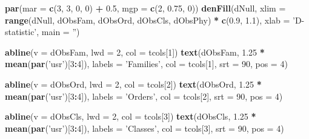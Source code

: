 \documentclass[]{article}
\newenvironment{Shaded}{\begin{snugshade}}{\end{snugshade}}
\newcommand{\KeywordTok}[1]{\textcolor[rgb]{0.13,0.29,0.53}{\textbf{#1}}}
\newcommand{\DataTypeTok}[1]{\textcolor[rgb]{0.13,0.29,0.53}{#1}}
\newcommand{\DecValTok}[1]{\textcolor[rgb]{0.00,0.00,0.81}{#1}}
\newcommand{\FloatTok}[1]{\textcolor[rgb]{0.00,0.00,0.81}{#1}}
\newcommand{\StringTok}[1]{\textcolor[rgb]{0.31,0.60,0.02}{#1}}
\newcommand{\OperatorTok}[1]{\textcolor[rgb]{0.81,0.36,0.00}{\textbf{#1}}}
\newcommand{\NormalTok}[1]{#1}
\begin{document}
\begin{Shaded}
\begin{Highlighting}[]
\KeywordTok{par}\NormalTok{(}\DataTypeTok{mar =} \KeywordTok{c}\NormalTok{(}\DecValTok{3}\NormalTok{, }\DecValTok{3}\NormalTok{, }\DecValTok{0}\NormalTok{, }\DecValTok{0}\NormalTok{) }\OperatorTok{+}\StringTok{ }\FloatTok{0.5}\NormalTok{, }\DataTypeTok{mgp =} \KeywordTok{c}\NormalTok{(}\DecValTok{2}\NormalTok{, }\FloatTok{0.75}\NormalTok{, }\DecValTok{0}\NormalTok{))}
\KeywordTok{denFill}\NormalTok{(dNull, }\DataTypeTok{xlim =} \KeywordTok{range}\NormalTok{(dNull, dObsFam, dObsOrd, dObsCls, dObsPhy) }\OperatorTok{*}\StringTok{ }\KeywordTok{c}\NormalTok{(}\FloatTok{0.9}\NormalTok{, }\FloatTok{1.1}\NormalTok{), }
        \DataTypeTok{xlab =} \StringTok{'D-statistic'}\NormalTok{, }\DataTypeTok{main =} \StringTok{''}\NormalTok{)}

\KeywordTok{abline}\NormalTok{(}\DataTypeTok{v =}\NormalTok{ dObsFam, }\DataTypeTok{lwd =} \DecValTok{2}\NormalTok{, }\DataTypeTok{col =}\NormalTok{ tcols[}\DecValTok{1}\NormalTok{])}
\KeywordTok{text}\NormalTok{(dObsFam, }\FloatTok{1.25} \OperatorTok{*}\StringTok{ }\KeywordTok{mean}\NormalTok{(}\KeywordTok{par}\NormalTok{(}\StringTok{'usr'}\NormalTok{)[}\DecValTok{3}\OperatorTok{:}\DecValTok{4}\NormalTok{]), }\DataTypeTok{labels =} \StringTok{'Families'}\NormalTok{, }\DataTypeTok{col =}\NormalTok{ tcols[}\DecValTok{1}\NormalTok{],}
     \DataTypeTok{srt =} \DecValTok{90}\NormalTok{, }\DataTypeTok{pos =} \DecValTok{4}\NormalTok{)}

\KeywordTok{abline}\NormalTok{(}\DataTypeTok{v =}\NormalTok{ dObsOrd, }\DataTypeTok{lwd =} \DecValTok{2}\NormalTok{, }\DataTypeTok{col =}\NormalTok{ tcols[}\DecValTok{2}\NormalTok{])}
\KeywordTok{text}\NormalTok{(dObsOrd, }\FloatTok{1.25} \OperatorTok{*}\StringTok{ }\KeywordTok{mean}\NormalTok{(}\KeywordTok{par}\NormalTok{(}\StringTok{'usr'}\NormalTok{)[}\DecValTok{3}\OperatorTok{:}\DecValTok{4}\NormalTok{]), }\DataTypeTok{labels =} \StringTok{'Orders'}\NormalTok{, }\DataTypeTok{col =}\NormalTok{ tcols[}\DecValTok{2}\NormalTok{],}
     \DataTypeTok{srt =} \DecValTok{90}\NormalTok{, }\DataTypeTok{pos =} \DecValTok{4}\NormalTok{)}

\KeywordTok{abline}\NormalTok{(}\DataTypeTok{v =}\NormalTok{ dObsCls, }\DataTypeTok{lwd =} \DecValTok{2}\NormalTok{, }\DataTypeTok{col =}\NormalTok{ tcols[}\DecValTok{3}\NormalTok{])}
\KeywordTok{text}\NormalTok{(dObsCls, }\FloatTok{1.25} \OperatorTok{*}\StringTok{ }\KeywordTok{mean}\NormalTok{(}\KeywordTok{par}\NormalTok{(}\StringTok{'usr'}\NormalTok{)[}\DecValTok{3}\OperatorTok{:}\DecValTok{4}\NormalTok{]), }\DataTypeTok{labels =} \StringTok{'Classes'}\NormalTok{, }\DataTypeTok{col =}\NormalTok{ tcols[}\DecValTok{3}\NormalTok{],}
     \DataTypeTok{srt =} \DecValTok{90}\NormalTok{, }\DataTypeTok{pos =} \DecValTok{4}\NormalTok{)}


\end{Highlighting}
\end{Shaded}
\end{document}
